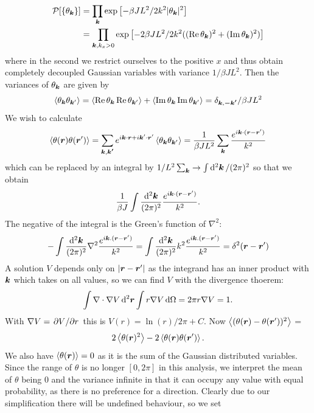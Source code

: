  \[
 \begin{split}
 \mathcal{P}[\{\theta_{\boldsymbol{k}}\}] &= \prod_{\boldsymbol{k}} \exp \left[-\beta J L^2/2 k^2 |\theta_{\boldsymbol{k}}|^2 \right] \\ &=\prod_{\boldsymbol{k}, k_x > 0} \exp \left[-2\beta J L^2/2 k^2((\Re \theta_{\boldsymbol{k}})^2 + (\Im \theta_{\boldsymbol{k}})^2) \right]
 \end{split}
 \]
 where in the second we restrict ourselves to the positive $x$ and thus obtain completely decoupled Gaussian variables with variance $1/\beta J L^2$. Then the variances of $\theta_{\boldsymbol{k}}$ are given by 
 \[
 \left < \theta_{\boldsymbol{k}} \theta_{\boldsymbol{k}'} \right > = \left < \Re \theta_{\boldsymbol{k}} \Re \theta_{\boldsymbol{k}'} \right > + \left < \Im \theta_{\boldsymbol{k}} \Im \theta_{\boldsymbol{k}'} \right > = \delta_{\boldsymbol{k}, \boldsymbol{-k'}}/\beta J L^2 
 \]
 We wish to calculate 
 \[
 \left < \theta(\boldsymbol{r})\theta(\boldsymbol{r}') \right > = \sum_{\boldsymbol{k}, \boldsymbol{k'}} e^{i \boldsymbol{k} \cdot \boldsymbol{r} + i \boldsymbol{k}' \cdot \boldsymbol{r}'} \left < \theta_{\boldsymbol{k}} \theta_{\boldsymbol{k}'} \right > = \frac{1}{\beta JL^2}\sum_{\boldsymbol{k}} \frac{e^{i \boldsymbol{k} \cdot( \boldsymbol{r} - \boldsymbol{r}')}}{k^2}
 \]
 which can be replaced by an integral by $1/L^2 \sum_{\boldsymbol{k}} \to \int \dd[2]{\boldsymbol{k}}/(2\pi)^2 $ so that we obtain
 \[
 \frac{1}{\beta J} \int \frac{\dd[2]{\boldsymbol{k}}}{(2 \pi)^2} \frac{e^{i \boldsymbol{k} \cdot( \boldsymbol{r} - \boldsymbol{r}')}}{k^2}.
 \]
 The negative of the integral is the Green's function of $\nabla^2$:
 \[
 -\int  \frac{\dd[2]{\boldsymbol{k}}}{(2 \pi)^2} \nabla^2 \frac{e^{i \boldsymbol{k}.(\boldsymbol{r} - \boldsymbol{r}')}}{k^2} = \int  \frac{\dd[2]{\boldsymbol{k}}}{(2 \pi)^2} k^2 \frac{e^{i \boldsymbol{k}.(\boldsymbol{r} - \boldsymbol{r}')}}{k^2} = \delta^2(\boldsymbol{r}-\boldsymbol{r}')
 \]
 A solution $V$ depends only on $|\boldsymbol{r}-\boldsymbol{r}'|$ as the integrand has an inner product with $\boldsymbol{k}$ which takes on all values, so we can find $V$ with the divergence thoerem:
 \[
 \int \nabla \cdot \nabla V\dd[2]{\boldsymbol{r}} \int r \nabla V \dd{\Omega} = 2 \pi r \nabla V  = 1. 
 \]
 With $\nabla V = \pdv*{V}{r}$  this is $V(r) = \ln(r)/2\pi +C$. Now $\left < (\theta(\boldsymbol{r}) - \theta(\boldsymbol{r}'))^2 \right >$ = 
 \[
 2\left < \theta(\boldsymbol{r})^2 \right > - 2\left < \theta(\boldsymbol{r})\theta(\boldsymbol{r}') \right >.
 \]
We also have $\left < \theta(\boldsymbol{r}) \right >=0$ as it is the sum of the Gaussian distributed variables. Since the range of $\theta$ is no longer $[0,2\pi]$ in this analysis, we interpret the mean of $\theta$ being 0 and the variance infinite in that it can occupy any value with equal probability, as there is no preference for a direction. Clearly due to our simplification there will be undefined behaviour, so we set 
